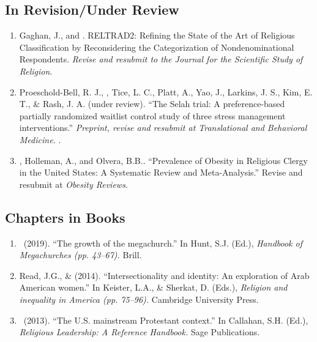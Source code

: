 \subsection*{In Revision/Under Review}
\begin{enumerate}

\item Gaghan, J., and \Eagle.  RELTRAD2: Refining the State of the Art of Religious Classification by Reconsidering the Categorization of Nondenominational Respondents. \textit{Revise and resubmit to the \textit{Journal for the Scientific Study of Religion}}.

\item Proeschold-Bell, R. J., \Eagle, Tice, L. C., Platt, A., Yao, J., Larkins, J. S., Kim, E. T., \& Rash, J. A. (under review). ``The Selah trial: A preference-based partially randomized waitlist control study of three stress management interventions.''  \textit{Preprint, revise and resubmit at \textit{Translational and Behavioral Medicine}.}  .

\item \Eagle, Holleman, A., and Olvera, B.B.. ``Prevalence of Obesity in Religious Clergy in the United States: A Systematic Review and Meta-Analysis.'' Revise and resubmit at \textit{Obesity Reviews}.

\end{enumerate}

\subsection*{Chapters in Books}
\begin{enumerate} 
\item \Eagle\ (2019). ``The growth of the megachurch.'' In Hunt, S.J. (Ed.), \emph{Handbook of Megachurches (pp. 43--67).} Brill.

\item Read, J.G., \& \Eagle \hspace{.01em}  (2014). ``Intersectionality and identity: An exploration of Arab American women.'' In Keister, L.A., \& Sherkat, D. (Eds.), \emph{Religion and inequality in America (pp. 75--96).} Cambridge University Press.

\item \Eagle\ (2013). ``The U.S. mainstream Protestant context.'' In Callahan, S.H. (Ed.), \emph{Religious Leadership: A Reference Handbook.} Sage Publications.
\end{enumerate}

